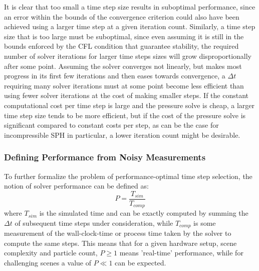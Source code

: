 \documentclass[oneside, a4paper]{book}
\begin{document}
    It is clear that too small a time step size results in suboptimal performance, since an error within the bounds of the convergence criterion could also have been achieved using a larger time step at a given iteration count. Similarly, a time step size that is too large must be suboptimal, since even assuming it is still in the bounds enforced by the CFL condition that guarantee stability, the required number of solver iterations for larger time steps sizes will grow disproportionally after some point. Assuming the solver converges not linearly, but makes most progress in its first few iterations and then eases towards convergence, a $\Delta t$ requiring many solver iterations must at some point become less efficient than using fewer solver iterations at the cost of making smaller steps. If the constant computational cost per time step is large and the pressure solve is cheap, a larger time step size tends to be more efficient, but if the cost of the pressure solve is significant compared to constant costs per step, as can be the case for incompressible SPH in particular, a lower iteration count might be desirable.

    \subsubsection{Defining Performance from Noisy Measurements}

    To further formalize the problem of performance-optimal time step selection, the notion of solver performance can be defined as:
    \begin{equation}\label{eq:solver-performance}
      P = \frac{T_{sim}}{T_{comp}}
    \end{equation}
    where $T_{sim}$ is the simulated time and can be exactly computed by summing the $\Delta t$ of subsequent time steps under consideration, while $T_{comp}$ is some measurement of the wall-clock-time or process time taken by the solver to compute the same steps. This means that for a given hardware setup, scene complexity and particle count, $P\geq 1$ means 'real-time' performance, while for challenging scenes a value of $P \ll 1$ can be expected.
\end{document}
